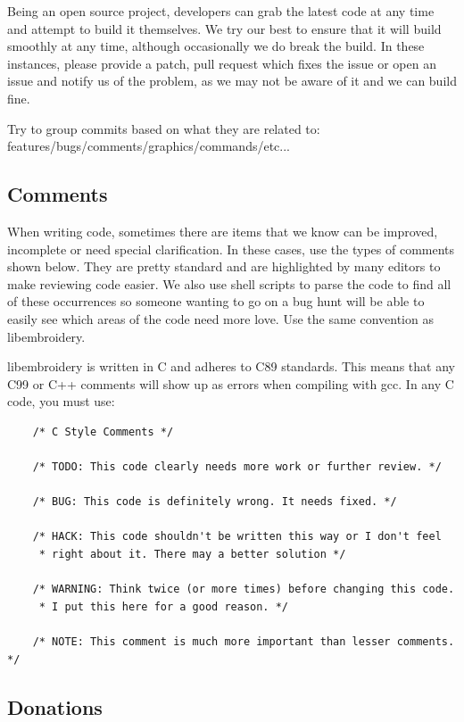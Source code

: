 \documentclass[a4paper, 11pt]{report}
\begin{document}
Being an open source project, developers can grab the latest code at any time
and attempt to build it themselves. We try our best to ensure that it will build smoothly
at any time, although occasionally we do break the build. In these instances,
please provide a patch, pull request which fixes the issue or open an issue and
notify us of the problem, as we may not be aware of it and we can build fine.

Try to group commits based on what they are related to: features/bugs/comments/graphics/commands/etc...

\subsection{Comments}

When writing code, sometimes there are items that we know can be improved,
incomplete or need special clarification. In these cases, use the types of
comments shown below. They are pretty standard and are highlighted by many editors to
make reviewing code easier. We also use shell scripts to parse the code to find
all of these occurrences so someone wanting to go on a bug hunt will be able to
easily see which areas of the code need more love. Use the same convention
as libembroidery.

libembroidery is written in C and adheres to C89 standards. This means
that any C99 or C++ comments will show up as errors when compiling with
gcc. In any C code, you must use:

\begin{verbatim}
    /* C Style Comments */

    /* TODO: This code clearly needs more work or further review. */

    /* BUG: This code is definitely wrong. It needs fixed. */

    /* HACK: This code shouldn't be written this way or I don't feel
     * right about it. There may a better solution */

    /* WARNING: Think twice (or more times) before changing this code.
     * I put this here for a good reason. */

    /* NOTE: This comment is much more important than lesser comments. */
\end{verbatim}

\subsection{Donations}
\end{document}
